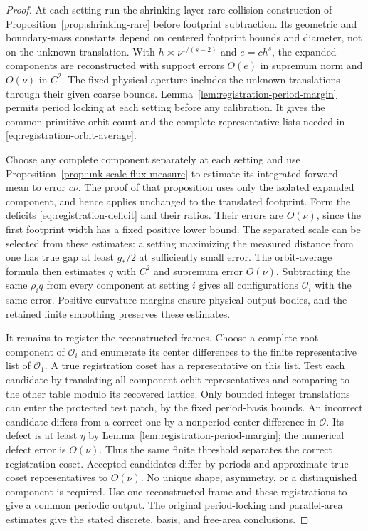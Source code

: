 \begin{proof}
At each setting run the shrinking-layer rare-collision construction
of Proposition~\ref{prop:shrinking-rare} before footprint subtraction. Its geometric and boundary-mass constants
depend on centered footprint bounds and diameter, not on the
unknown translation. With $h\asymp\nu^{1/(s-2)}$ and $e=c h^s$,
the expanded components are reconstructed with support errors
$O(e)$ in supremum norm and $O(\nu)$ in $C^2$. The fixed physical
aperture includes the unknown translations through their given
coarse bounds. Lemma~\ref{lem:registration-period-margin} permits
period locking at each setting before any calibration. It gives
the common primitive orbit count and the complete representative
lists needed in \eqref{eq:registration-orbit-average}.

Choose any complete component separately at each setting and use
Proposition~\ref{prop:unk-scale-flux-measure} to estimate its
integrated forward mean to error $c\nu$. The proof of that
proposition uses only the isolated expanded component, and hence
applies unchanged to the translated footprint. Form the deficits
\eqref{eq:registration-deficit} and their ratios. Their errors are
$O(\nu)$, since the first footprint width has a fixed positive
lower bound. The separated scale can be selected from these
estimates: a setting maximizing the measured distance from one
has true gap at least $g_*/2$ at sufficiently small error.
The orbit-average formula then estimates $q$ with $C^2$ and
supremum error $O(\nu)$. Subtracting the same $\rho_iq$ from
every component at setting $i$ gives all configurations
$\mathcal O_i$ with the same error. Positive curvature margins
ensure physical output bodies, and the retained finite smoothing
preserves these estimates.

It remains to register the reconstructed frames. Choose a complete
root component of $\mathcal O_i$ and enumerate its center differences
to the finite representative list of $\mathcal O_1$. A true
registration coset has a representative on this list. Test each
candidate by translating all component-orbit representatives and
comparing to the other table modulo its recovered lattice. Only
bounded integer translations can enter the protected test patch,
by the fixed period-basis bounds. An
incorrect candidate differs from a correct one by a nonperiod
center difference in $\mathcal O$. Its defect is at least $\eta$
by Lemma~\ref{lem:registration-period-margin}; the numerical defect
error is $O(\nu)$. Thus the same finite threshold separates the
correct registration coset. Accepted candidates differ by periods
and approximate true coset representatives to $O(\nu)$. No unique
shape, asymmetry, or a distinguished component is required. Use one
reconstructed frame and these registrations to give a common
periodic output. The original period-locking and parallel-area
estimates give the stated discrete, basis, and free-area conclusions.


\end{proof}
